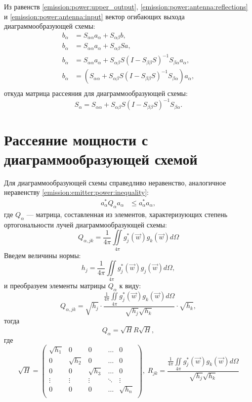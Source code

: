 Из равенств \eqref{emission:power:upper_output}, \eqref{emission:power:antenna:reflections} и \eqref{emission:power:antenna:input} вектор огибающих выхода
диаграммообразующей схемы:
\begin{align*}
    b_\alpha & = S_{\alpha \alpha} a_\alpha + S_{\alpha \beta} b , \\
    b_\alpha & = S_{\alpha \alpha} a_\alpha + S_{\alpha \beta} S a , \\
    b_\alpha & = S_{\alpha \alpha} a_\alpha + S_{\alpha \beta} S ( I - S_{\beta \beta} S )^{-1} S_{\beta \alpha} a_\alpha , \\
    b_\alpha & = ( S_{\alpha \alpha} + S_{\alpha \beta} S ( I - S_{\beta \beta} S )^{-1} S_{\beta \alpha} ) a_\alpha , \\
\end{align*}
откуда матрица рассеяния для диаграммообразующей схемы:
\begin{equation}
    \label{emission:power:scheme:reflections}
    S_\alpha = S_{\alpha \alpha} + S_{\alpha \beta} S ( I - S_{\beta \beta} S )^{-1} S_{\beta \alpha} .
\end{equation}


\section{Рассеяние мощности с диаграммообразующей схемой}

Для диаграммообразующей схемы справедливо неравенство, аналогичное неравенству \eqref{emission:emitter:power:inequality}:
\begin{align}
    a_\alpha^* Q_\alpha a_\alpha & \le a_\alpha^* a_\alpha , \label{emission:power:scheme:inequality}
\end{align}
где $Q_\alpha$ --- матрица, составленная из элементов, характеризующих степень ортогональности лучей диаграммообразующей схемы:
\[
    Q_{\alpha,jk} = \frac{1}{4 \pi} \iint \limits_{4 \pi} g_{j}^*(\vec{w}) g_{k}(\vec{w}) d \Omega
\]
Введем величины нормы:
\[
    h_j = \frac{1}{4 \pi} \iint \limits_{4 \pi} g_{j}^*(\vec{w}) g_{j}(\vec{w}) d \Omega ,
\]
и преобразуем элементы матрицы $Q_\alpha$ к виду:
\[
    Q_{\alpha,jk}
    =
    \sqrt{h_j}
    \cdot
    \frac{\frac{1}{4 \pi} \iint \limits_{4 \pi} g_j^*(\vec{w}) g_k(\vec{w}) d \Omega}{\sqrt{h_j} \sqrt{h_k}}
    \cdot
    \sqrt{h_k} ,
\]
тогда
\[
    Q_\alpha = \sqrt{H} R \sqrt{H} ,
\]
где
\[
    \sqrt{H}
    = \begin{pmatrix}
          \sqrt{h_1} & 0          & 0          & \dots  & 0          \\
          0          & \sqrt{h_2} & 0          & \dots  & 0          \\
          0          & 0          & \sqrt{h_3} & \dots  & 0          \\
          \vdots     & \vdots     & \vdots     & \ddots & \vdots     \\
          0          & 0          & 0          & \dots  & \sqrt{h_n} \\
    \end{pmatrix} ,
    \;
    R_{jk} = \frac{\frac{1}{4 \pi} \iint \limits_{4 \pi} g_j^*(\vec{w}) g_k(\vec{w}) d \Omega}{\sqrt{h_j} \sqrt{h_k}}
\]

